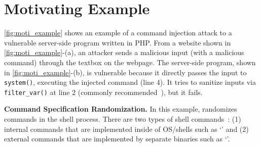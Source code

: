 \section{Motivating Example}
\label{sec:motivation}


\autoref{fig:moti_example} shows an example of a  command injection attack to a vulnerable server-side program written in PHP. 
%
From a website shown in \autoref{fig:moti_example}-(a), an attacker sends a malicious input (with a malicious command) through the textbox on the webpage. The server-side program, shown in \autoref{fig:moti_example}-(b), is vulnerable because it directly passes the input to {\tt system()}, executing the injected command (line 4). It tries to sanitize inputs via {\tt filter\_var()} at line 2 (commonly recommended~\cite{php_sanitize1, php_sanitize2, php_sanitize3}), but it fails. %

\noindent
{\bf Command Specification Randomization.} 
In this example, \sysname randomizes commands in the shell process. %
There are two types of shell commands~\cite{linux_commands_external_internal}: (1) internal commands that are implemented inside of OS/shells such as `' and (2) external commands that are implemented by separate binaries such as `'. 

